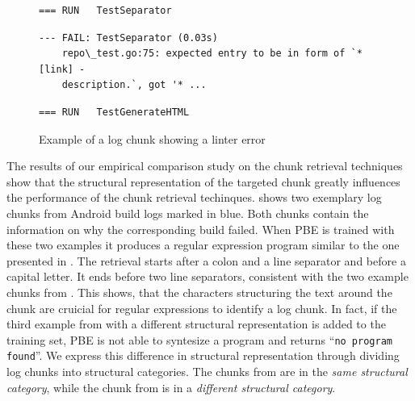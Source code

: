 \begin{figure}[!t]
  \centering
  \begin{lstlisting}[breaklines=true,frame=tlr]
=== RUN   TestSeparator
  \end{lstlisting}
  \vspace{-\baselineskip}
  \begin{lstlisting}[backgroundcolor=\color{Cerulean!60},breaklines=true,frame=rl]
--- FAIL: TestSeparator (0.03s)
    repo\_test.go:75: expected entry to be in form of `* [link] -
    description.`, got '* ...
  \end{lstlisting}
  \vspace{-\baselineskip}
  \begin{lstlisting}[breaklines=true,frame=blr]
=== RUN   TestGenerateHTML
  \end{lstlisting}
  \caption{Example of a log chunk showing a linter error}
  \label{lst:chunk-example-3}
\end{figure}

The results of our empirical comparison study on the chunk retrieval
techniques
show that the structural representation of the targeted chunk greatly
influences
the performance of the chunk retrieval techinques.
 shows two exemplary
log chunks from Android build logs marked in blue.
Both chunks contain the information on why the
corresponding build failed.
When PBE is trained with these two examples it produces
a regular expression program similar to the one presented in
.
The retrieval
starts after a colon and a line separator and before a capital
letter.
It ends before two line separators, consistent with the two example
chunks from .
This shows, that the characters structuring the text around the chunk are
cruicial for regular expressions to identify a log chunk.
In fact, if the third example from  with a
different structural representation is added to the training set,
PBE is not able to syntesize a program and returns
``\texttt{no program found}''.
We express this difference in structural representation through
dividing log chunks into structural categories.
The chunks from 
are in the \emph{same structural category}, while the chunk from
 is in a \emph{different structural category}.


